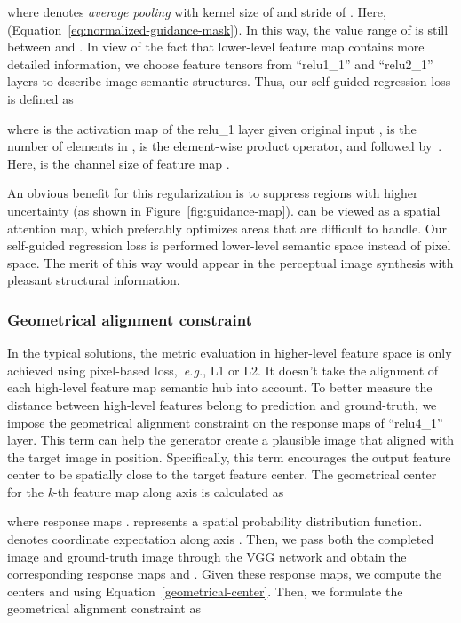 \documentclass[journal]{IEEEtran}
\newcommand{\eg}{\emph{e.g.}}
\begin{document}
where  denotes \emph{average pooling} with kernel size of  and stride of . Here,  (Equation~\ref{eq:normalized-guidance-mask}). In this way, the value range of  is still between  and . In view of the fact that lower-level feature map contains more detailed information, we choose feature tensors from ``relu1\_1'' and ``relu2\_1'' layers to describe image semantic structures. Thus, our self-guided regression loss is defined as
\begin{small}
	
\end{small}
where  is the activation map of the relu\_1 layer given original input ,  is the number of elements in ,  is the element-wise product operator, and  followed by~\cite{non-stationary}. Here,  is the channel size of feature map . 

An obvious benefit for this regularization is to suppress regions with higher uncertainty (as shown in Figure~\ref{fig:guidance-map}).  can be viewed as a spatial attention map, which preferably optimizes areas that are difficult to handle. Our self-guided regression loss is performed lower-level semantic space instead of pixel space. The merit of this way would appear in the perceptual image synthesis with pleasant structural information.

\subsubsection{Geometrical alignment constraint}
In the typical solutions, the metric evaluation in higher-level feature space is only achieved using pixel-based loss,~\eg, L1 or L2. It doesn't take the alignment of each high-level feature map semantic hub into account. To better measure the distance between high-level features belong to prediction and ground-truth, we impose the geometrical alignment constraint on the response maps of ``relu4\_1'' layer. This term can help the generator create a plausible image that aligned with the target image in position. Specifically, this term encourages the output feature center to be spatially close to the target feature center. The geometrical center for the \textit{k}-th feature map along axis  is calculated as

where response maps .  represents a spatial probability distribution function.  denotes coordinate expectation along axis . Then, we pass both the completed image  and ground-truth image  through the VGG network and obtain the corresponding response maps  and . Given these response maps, we compute the centers  and  using Equation~\ref{geometrical-center}. Then, we formulate the geometrical alignment constraint as
\end{document}
